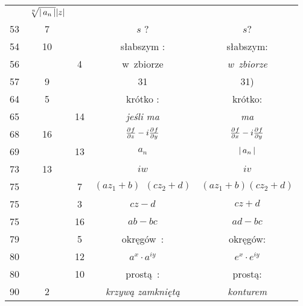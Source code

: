 \documentclass[a4paper,11pt]{article}
\begin{document}
\begin{center}
\begin{tabular}{|c|c|c|c|c|}
           & $\sqrt[n]{ \left| \,  a_{ n }  \, \right| } | z |$ \\
    53  &  7 & & $s$ ? & $s$? \\
    54  & 10 & & słabszym : & słabszym: \\
    56  & &  4 & w~zbiorze & \emph{w~zbiorze} \\
    57  &  9 & & 31 & 31) \\
    64  &  5 & & krótko : & krótko: \\
    65  & & 14 & \emph{jeśli ma} & \emph{ma} \\
    68  & 16 & & $\frac{ \partial^{  } {  f  } }{ \partial {  z  }^{  } } - i \frac{ \partial^{  } {  f  } }{ \partial {  y  }^{  } }$
           & $\frac{ \partial^{  } {  f  } }{ \partial {  x  }^{  } } - i \frac{ \partial^{  } {  f  } }{ \partial {  y  }^{  } }$ \\
    69  & & 13 & $a_{ n }$ & $\left| \,  a_{ n }  \, \right|$ \\
    73  & 13 & & $iw$ & $iv$ \\
    75  & &  7 & $( a z_{ 1 } + b )\;\, ( c z_{ 2 } + d )$
           & $( a z_{ 1 } + b ) ( c z_{ 2 } + d )$ \\
    75  & &  3 & $c z - d$ & $c z + d$ \\
    75  & & 16 & $ab - bc$ & $ad - bc$ \\
    79  & &  5 & okręgów~: & okręgów: \\
    80  & & 12 & $a^{ x } \cdot a^{ iy }$ & $e^{ x } \cdot e^{ iy }$ \\
    80  & & 10 & prostą~: & prostą: \\
    90  &  2 & & \emph{krzywą zamkniętą} & \emph{konturem} \\
    \hline
  \end{tabular}


\end{center}
\end{document}
